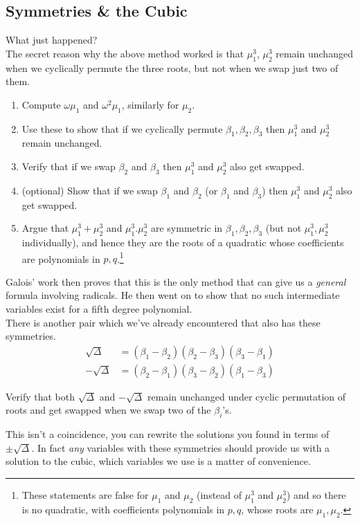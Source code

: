 \newpage
\subsection{Symmetries \& the Cubic }
What just happened?\\

The secret reason why the above method worked is that $ \mu_1^3$, $\mu_2^3$ remain unchanged when we cyclically permute the three roots, but not when we swap just two of them. 
\begin{questions}[resume]
  \item 
  \begin{enumerate}
    \item Compute $ \omega \mu_1$ and $ \omega^2 \mu_1$, similarly for $ \mu_2$.
    \item Use these to show that if we cyclically permute $ \beta_1, \beta_2, \beta_3$ then $ \mu_1^3$  and $ \mu_2^3$ remain unchanged.
    \item Verify that if we swap $ \beta_2$ and $ \beta_3$ then $ \mu_1^3$ and $ \mu_2^3$ also get swapped. 
    \item (optional) Show that if we swap $ \beta_1$ and $ \beta_2$ (or $ \beta_1$ and $ \beta_3$) then $ \mu_1^3$ and $ \mu_2^3$ also get swapped. 
    \item Argue that $ \mu_1^3 + \mu_2^3$ and $ \mu_1^3.\mu_2^3$ are symmetric in $ \beta_1, \beta_2, \beta_3$ (but not $\mu_1^3,\mu_2^3$ individually), and hence they are the roots of a quadratic whose coefficients are polynomials in $ p,q$.\footnote{These statements are false for $ \mu_1$ and $ \mu_2$ (instead of $ \mu_1^3$ and $ \mu_2^3$) and so there is no quadratic, with coefficients polynomials in $ p,q$, whose roots are $ \mu_1, \mu_2$. }
  \end{enumerate}
\end{questions}

Galois' work then proves that this is the only method that can give us a \emph{general} formula involving radicals. He then went on to show that no such intermediate variables exist for a fifth degree polynomial. \\

\noindent There is another pair which we've already encountered that also has these symmetries. 
\begin{align*}
  \sqrt{\Delta} &= (\beta_1 - \beta_2)(\beta_2 - \beta_3)(\beta_3 - \beta_1) 
  \\
  -\sqrt{\Delta} &= (\beta_2 - \beta_1)(\beta_3 - \beta_2)(\beta_1 - \beta_3)
\end{align*}
\begin{questions}[resume]
    \item Verify that both $\sqrt{\Delta}$ and $-\sqrt{\Delta}$ remain unchanged under cyclic permutation of roots and get swapped when we swap two of the $ \beta_i$'s.
\end{questions}
This isn't a coincidence, you can rewrite the solutions you found in terms of $ \pm \sqrt {\Delta}$. In fact \emph{any} variables with these symmetries should provide us with a solution to the cubic, which variables we use is a matter of convenience.

